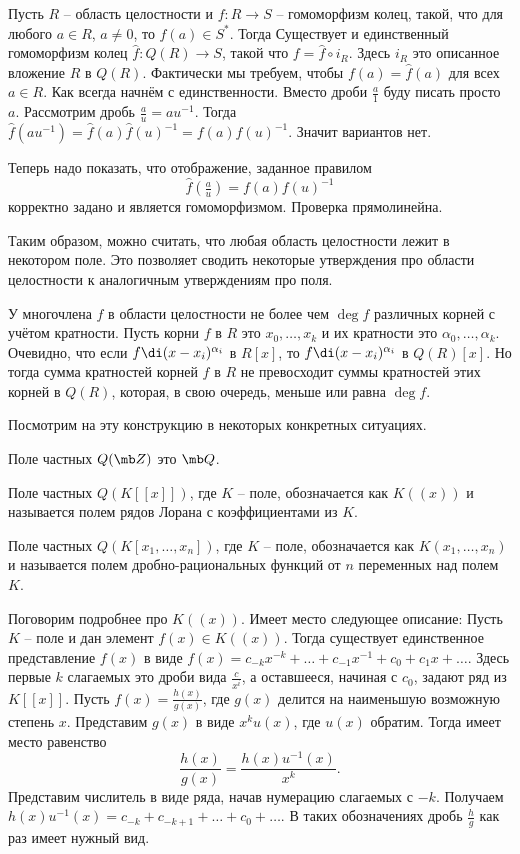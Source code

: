  Пусть $R$ -- область целостности и $f\colon R \to S$ -- гомоморфизм колец, такой, что для любого $a\in R$, $a\neq 0$, то $f(a)\in S^*$. Тогда Существует и единственный гомоморфизм колец $\hat{f} \colon Q(R)\to S$, такой что $f=\hat{f}\circ i_R$. Здесь $i_R$ это описанное вложение $R$ в $Q(R)$. Фактически мы требуем, чтобы $f(a)=\hat{f}(a)$ для всех $a\in R$. 
\ethrm
\proof Как всегда начнём с единственности. Вместо дроби $\tfrac{a}{1}$ буду писать просто $a$. Рассмотрим дробь $\tfrac{a}{u}=au^{-1}$. Тогда $\hat{f}(au^{-1})=\hat{f}(a)\hat{f}(u)^{-1}=f(a)f(u)^{-1}$. Значит вариантов нет.

Теперь надо показать, что отображение, заданное правилом
$$\hat{f}(\tfrac{a}{u})=f(a)f(u)^{-1}$$
корректно задано и является гомоморфизмом. Проверка прямолинейна.
\endproof


\endproof

Таким образом, можно считать, что любая область целостности лежит в некотором поле. Это позволяет сводить некоторые утверждения про области целостности к аналогичным утверждениям про поля.


\crl У многочлена $f$ в области целостности не более чем $\deg f$ различных корней с учётом кратности.
\ecrl
\proof Пусть корни $f$ в $R$ это $x_0,\dots,x_k$ и их кратности это $\alpha_0,\dots,\alpha_k$.  Очевидно, что если $f\di (x-x_i)^{\alpha_i}$ в $R[x]$, то $f\di (x-x_i)^{\alpha_i}$ в $Q(R)[x]$. Но тогда сумма кратностей корней $f$ в $R$ не превосходит суммы кратностей этих корней в $Q(R)$, которая, в свою  очередь, меньше или равна $\deg f $.
\endproof

Посмотрим на эту конструкцию в некоторых конкретных ситуациях.
\enm
\item Поле частных $Q(\mb Z)$ это $\mb Q$. 
\item Поле частных $Q(K[[x]])$, где $K$ -- поле, обозначается как $K((x))$ и называется полем рядов Лорана с коэффициентами из $K$.
\item Поле частных $Q(K[x_1,\dots,x_n])$, где $K$ -- поле, обозначается как $K(x_1,\dots,x_n)$ и называется полем дробно-рациональных функций от $n$ переменных над полем $K$.  
\eenm

Поговорим подробнее про $K((x))$. Имеет место следующее описание:
\utv Пусть $K$ -- поле и дан элемент $f(x)\in K((x))$. Тогда существует единственное представление $f(x)$ в виде $f(x)=c_{-k}x^{-k}+\dots+ c_{-1}x^{-1}+c_0+c_1x+\dots$. Здесь первые $k$ слагаемых это дроби вида $\frac{c}{x^i}$, а оставшееся, начиная с $c_0$, задают ряд из $K[[x]]$. 
\eutv 
\proof Пусть $f(x)=\frac{h(x)}{g(x)}$, где $g(x)$ делится на наименьшую возможную степень $x$. Представим  $g(x)$ в виде $x^k u(x)$, где $u(x)$ обратим. Тогда имеет место равенство 
$$\frac{h(x)}{g(x)}=\frac{h(x)u^{-1}(x)}{x^k}.$$
Представим числитель в виде ряда, начав нумерацию слагаемых с $-k$. Получаем 
$h(x)u^{-1}(x)=c_{-k}+c_{-k+1}+\dots + c_0 +\dots $. В таких обозначениях дробь $\frac{h}{g}$ как раз имеет нужный вид.

